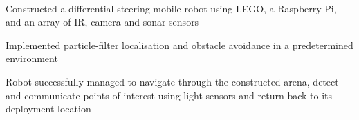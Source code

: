 \documentclass[]{lukas-cv-openfont}
\begin{document}
\noindent
{}
\\
\begin{tightitemize}{1.7em}
    \item Constructed a differential steering mobile robot using LEGO, a Raspberry Pi, and an array of IR, camera and sonar sensors
    \item Implemented particle-filter localisation and obstacle avoidance in a predetermined environment
    \item Robot successfully managed to navigate through the constructed arena, detect and communicate points of interest using light sensors and return back to its deployment location
\end{tightitemize}

\end{document}
